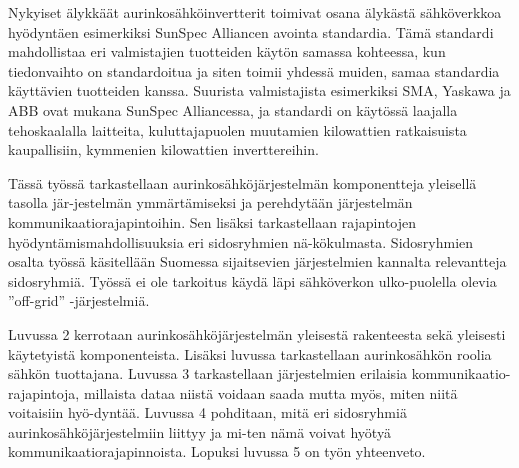 Nykyiset älykkäät aurinkosähköinvertterit toimivat osana älykästä sähköverkkoa hyödyntäen esimerkiksi SunSpec Alliancen avointa standardia. Tämä standardi mahdollistaa eri valmistajien tuotteiden käytön samassa kohteessa, kun tiedonvaihto on standardoitua ja siten toimii yhdessä muiden, samaa standardia käyttävien tuotteiden kanssa. Suurista valmistajista esimerkiksi SMA, Yaskawa ja ABB ovat mukana SunSpec Alliancessa, ja standardi on käytössä laajalla tehoskaalalla laitteita, kuluttajapuolen muutamien kilowattien ratkaisuista kaupallisiin, kymmenien kilowattien inverttereihin. \parencite{SSProds}

Tässä työssä tarkastellaan aurinkosähköjärjestelmän komponentteja yleisellä tasolla jär-jestelmän ymmärtämiseksi ja perehdytään järjestelmän kommunikaatiorajapintoihin. Sen lisäksi tarkastellaan rajapintojen hyödyntämismahdollisuuksia eri sidosryhmien nä-kökulmasta. Sidosryhmien osalta työssä käsitellään Suomessa sijaitsevien järjestelmien kannalta relevantteja sidosryhmiä. Työssä ei ole tarkoitus käydä läpi sähköverkon ulko-puolella olevia ”off-grid” -järjestelmiä.

Luvussa 2 kerrotaan aurinkosähköjärjestelmän yleisestä rakenteesta sekä yleisesti käytetyistä komponenteista. Lisäksi luvussa tarkastellaan aurinkosähkön roolia sähkön tuottajana. Luvussa 3 tarkastellaan järjestelmien erilaisia kommunikaatio-rajapintoja, millaista dataa niistä voidaan saada mutta myös, miten niitä voitaisiin hyö-dyntää. Luvussa 4 pohditaan, mitä eri sidosryhmiä aurinkosähköjärjestelmiin liittyy ja mi-ten nämä voivat hyötyä kommunikaatiorajapinnoista. Lopuksi luvussa 5 on työn yhteenveto.
